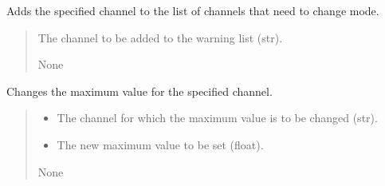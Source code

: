 \documentclass[letterpaper,10pt,english]{sphinxmanual}
\begin{document}
\begin{fulllineitems}
\begin{fulllineitems}
\label{\detokenize{StartStopHist:StartStopHist.WorkerThreadStartStopHistogram.addChannelWarning}}
\pysigstartsignatures
{}
\pysigstopsignatures
\sphinxAtStartPar
Adds the specified channel to the list of channels that need to change mode.
\begin{quote}\begin{description}
\sphinxAtStartPar
{} \textendash{} The channel to be added to the warning list (str).

\sphinxAtStartPar
None

\end{description}\end{quote}

\end{fulllineitems}


\begin{fulllineitems}
\label{\detokenize{StartStopHist:StartStopHist.WorkerThreadStartStopHistogram.changeMaxValue}}
\pysigstartsignatures
{}
\pysigstopsignatures
\sphinxAtStartPar
Changes the maximum value for the specified channel.
\begin{quote}\begin{description}
\begin{itemize}
\item {} 
\sphinxAtStartPar
{} \textendash{} The channel for which the maximum value is to be changed (str).

\item {} 
\sphinxAtStartPar
{} \textendash{} The new maximum value to be set (float).

\end{itemize}

\sphinxAtStartPar
None

\end{description}\end{quote}


\end{fulllineitems}
\end{fulllineitems}
\end{document}
